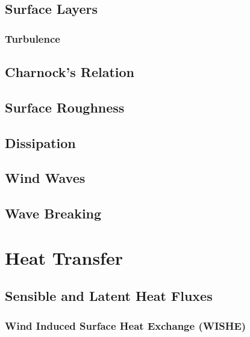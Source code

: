 \documentclass{report}
\begin{document}
    \section{Surface Layers}
\label{surfacelayers}
    \lipsum[1-2]

   \subsection{Turbulence}
\label{momturbulence} 
    \lipsum[1-2]

    \section{Charnock's Relation}
\label{charnock}
    \lipsum[1-2]
  
    \section{Surface Roughness}
\label{surfaceroughness}
    \lipsum[1-2]

    \section{Dissipation}
\label{dissipation}
    \lipsum[1-2]  	

    \section{Wind Waves}
\label{windwaves}
    \lipsum[1-2]

    \section{Wave Breaking}
\label{momwavebreaking}
    \lipsum[1-2]

\chapter{Heat Transfer}
\label{heattransfer}
    \lipsum[10]
  
    \section{Sensible and Latent Heat Fluxes}
\label{heatflux}
    \lipsum[1-2]

\subsection{Wind Induced Surface Heat Exchange (WISHE)}
\label{wishe}
   
\end{document}
